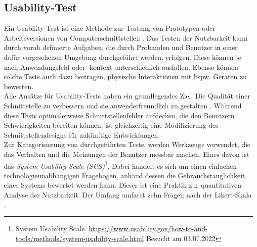     \subsection{Usability-Test}
    \label{subsec:usabilitytests}
        Ein Usability-Test ist eine Methode zur Testung von Prototypen oder Arbeitsversionen von Computerschnittstellen \cite{LAZAR2017263}. 
        Das Testen der Nutzbarkeit kann durch vorab definierte Aufgaben, die durch Probanden und Benutzer in einer dafür vorgesehenen 
        Umgebung durchgeführt werden, erfolgen. Diese können je nach Anwendungsfeld oder -kontext unterschiedlich ausfallen. 
        Ebenso können solche Tests auch dazu beitragen, physische Interaktionen mit bspw. Geräten zu bewerten. 
        \\
        Alle Ansätze für Usability-Tests haben ein grundlegendes Ziel: Die Qualität einer Schnittstelle zu verbessern und sie anwenderfreundlich zu 
        gestalten \cite{LAZAR2017263}. Während diese Tests optimalerweise Schnittstellenfehler aufdecken, die den Benutzern Schwierigkeiten bereiten 
        können, ist gleichzeitig eine Modifizierung des Schnittstellendesigns für zukünftige Entwicklungen. 
        \\
        \linebreak
        Zur Kategorisierung von durchgeführten Tests, werden Werkzeuge verwendet, die das Verhalten und die Meinungen der Benutzer 
        messbar machen. Eines davon ist das \textit{System Usability Scale (SUS)}\footnote{System Usability Scale. \url{https://www.usability.gov/how-to-and-tools/methods/system-usability-scale.html} Besucht am 03.07.2022}. 
        Dabei handelt es sich um einen einfachen 
        technologieunabhängigen Fragebogen, anhand dessen die Gebrauchstauglichkeit eines Systems bewertet werden kann. Dieser 
        ist eine Praktik zur quantitativen Analyse der Nutzbarkeit. Der Umfang umfasst zehn Fragen nach der Likert-Skala \cite{likert1932technique}.

